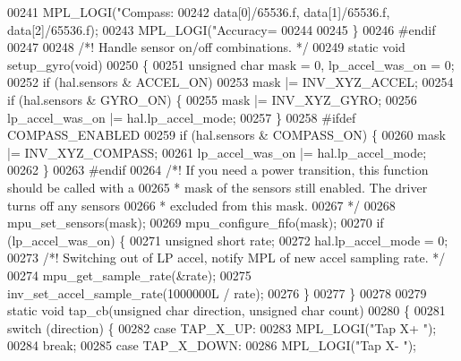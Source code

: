 \begin{DoxyCode}
{{{00241     MPL\_LOGI(\textcolor{stringliteral}{"Compass: %
00242             data[0]/65536.f, data[1]/65536.f, data[2]/65536.f);
00243     MPL\_LOGI(\textcolor{stringliteral}{"Accuracy= %
00244 
00245 \}
00246 \textcolor{preprocessor}{#}\textcolor{preprocessor}{endif}
00247 
00248 \textcolor{comment}{/*! Handle sensor on/off combinations. */}
00249 \textcolor{keyword}{static} \textcolor{keywordtype}{void} setup_gyro(\textcolor{keywordtype}{void})
00250 \{
00251     \textcolor{keywordtype}{unsigned} \textcolor{keywordtype}{char} mask = 0, lp\_accel\_was\_on = 0;
00252     \textcolor{keywordflow}{if} (hal.sensors & ACCEL_ON)
00253         mask |= INV\_XYZ\_ACCEL;
00254     \textcolor{keywordflow}{if} (hal.sensors & GYRO_ON) \{
00255         mask |= INV\_XYZ\_GYRO;
00256         lp\_accel\_was\_on |= hal.lp_accel_mode;
00257     \}
00258 \textcolor{preprocessor}{#}\textcolor{preprocessor}{ifdef} \textcolor{preprocessor}{COMPASS\_ENABLED}
00259     \textcolor{keywordflow}{if} (hal.sensors & COMPASS\_ON) \{
00260         mask |= INV\_XYZ\_COMPASS;
00261         lp\_accel\_was\_on |= hal.lp\_accel\_mode;
00262     \}
00263 \textcolor{preprocessor}{#}\textcolor{preprocessor}{endif}
00264     \textcolor{comment}{/*! If you need a power transition, this function should be called with a}
00265 \textcolor{comment}{     * mask of the sensors still enabled. The driver turns off any sensors}
00266 \textcolor{comment}{     * excluded from this mask.}
00267 \textcolor{comment}{     */}
00268     mpu\_set\_sensors(mask);
00269     mpu\_configure\_fifo(mask);
00270     \textcolor{keywordflow}{if} (lp\_accel\_was\_on) \{
00271         \textcolor{keywordtype}{unsigned} \textcolor{keywordtype}{short} rate;
00272         hal.lp_accel_mode = 0;
00273         \textcolor{comment}{/*! Switching out of LP accel, notify MPL of new accel sampling rate. */}
00274         mpu\_get\_sample\_rate(&rate);
00275         inv\_set\_accel\_sample\_rate(1000000L / rate);
00276     \}
00277 \}
00278 
00279 \textcolor{keyword}{static} \textcolor{keywordtype}{void} tap_cb(\textcolor{keywordtype}{unsigned} \textcolor{keywordtype}{char} direction, \textcolor{keywordtype}{unsigned} \textcolor{keywordtype}{char} count)
00280 \{
00281     \textcolor{keywordflow}{switch} (direction) \{
00282     \textcolor{keywordflow}{case} TAP\_X\_UP:
00283         MPL\_LOGI(\textcolor{stringliteral}{"Tap X+ "});
00284         \textcolor{keywordflow}{break};
00285     \textcolor{keywordflow}{case} TAP\_X\_DOWN:
00286         MPL\_LOGI(\textcolor{stringliteral}{"Tap X- "});
}}}}}
\end{DoxyCode}
